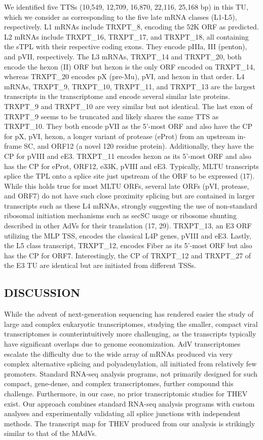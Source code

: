 \documentclass[
]{article}
\begin{document}
We identified five TTSs (10,549, 12,709, 16,870, 22,116, 25,168 bp) in
this TU, which we consider as corresponding to the five late mRNA
classes (L1-L5), respectively. L1 mRNAs include TRXPT\_8, encoding the
52K ORF as predicted. L2 mRNAs include TRXPT\_16, TRXPT\_17, and
TRXPT\_18, all containing the sTPL with their respective coding exons.
They encode pIIIa, III (penton), and pVII, respectively. The L3 mRNAs,
TRXPT\_14 and TRXPT\_20, both encode the hexon (II) ORF but hexon is the
only ORF encoded on TRXPT\_14, whereas TRXPT\_20 encodes pX (pre-Mu),
pVI, and hexon in that order. L4 mRNAs, TRXPT\_9, TRXPT\_10, TRXPT\_11,
and TRXPT\_13 are the largest transcripts in the transcriptome and
encode several similar late proteins. TRXPT\_9 and TRXPT\_10 are very
similar but not identical. The last exon of TRXPT\_9 seems to be
truncated and likely shares the same TTS as TRXPT\_10. They both encode
pVII as the 5'-most ORF and also have the CP for pX, pVI, hexon, a
longer variant of protease (eProt) from an upstream in-frame SC, and
ORF12 (a novel 120 residue protein). Additionally, they have the CP for
pVIII and eE3. TRXPT\_11 encodes hexon as its 5'-most ORF and also has
the CP for eProt, ORF12, e33K, pVIII and eE3. Typically, MLTU
transcripts splice the TPL onto a splice site just upstream of the ORF
to be expressed (17). While this holds true for most MLTU ORFs, several
late ORFs (pVI, protease, and ORF7) do not have such close proximity
splicing but are contained in larger transcripts such as these L4 mRNAs,
strongly suggesting the use of non-standard ribosomal initiation
mechanisms such as secSC usage or ribosome shunting described in other
AdVs for their translation (17, 29). TRXPT\_13, an E3 ORF utilizing the
MLP TSS, encodes the classical L4P genes, pVIII and eE3. Lastly, the L5
class transcript, TRXPT\_12, encodes Fiber as its 5'-most ORF but also
has the CP for ORF7. Interestingly, the CP of TRXPT\_12 and TRXPT\_27 of
the E3 TU are identical but are initiated from different TSSs. \newpage

\subsection{DISCUSSION}\label{discussion}

While the advent of next-generation sequencing has rendered easier the
study of large and complex eukaryotic transcriptomes, studying the
smaller, compact viral transcriptomes is counterintuitively more
challenging, as the transcripts typically have significant overlaps due
to genome economization. AdV transcriptomes escalate the difficulty due
to the wide array of mRNAs produced via very complex alternative
splicing and polyadenylation, all initiated from relatively few
promoters. Standard RNA-seq analysis programs, not primarily designed
for such compact, gene-dense, and complex transcriptomes, further
compound this challenge. Furthermore, in our case, no prior
transcriptomic studies for THEV exist. Our approach combines standard
RNA-seq analysis programs with custom analyses and experimentally
validating all splice junctions with independent methods. The transcript
map for THEV produced from our analysis is strikingly similar to that of
the MAdVs.
\end{document}
